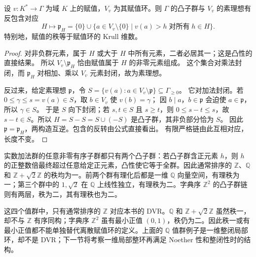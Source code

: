 \begin{proposition}\label{b3:prop:valuation-rank-dimension}
	设 \(v:K^*\rightarrow\Gamma\) 为域 \(K\) 上的赋值，\(V_v\) 为其赋值环。则 \(\Gamma\) 的凸子群与 \(V_v\) 的素理想有反包含对应
	\[
		H\longmapsto\mathfrak p_H =\{0\}\cup\bigl\{a\in V_v\setminus\{0\}\mid v(a)>h\;\text{对所有}\;h\in H\bigr\}.
	\]
	特别地，赋值的秩等于赋值环的 Krull 维数。
\end{proposition}
\begin{proof}
	对非负群元素，属于 \(H\) 或大于 \(H\) 中所有元素，二者必居其一；这是凸性的直接结果。 所以 \(V_v\setminus\mathfrak p_H\) 恰由赋值属于 \(H\) 的非零元素组成。 这个集合对乘法封闭，而 \(\mathfrak p_H\) 对相加、乘以 \(V_v\) 元素封闭，故为素理想。

	反过来，给定素理想 \(\mathfrak p\)，令 \(S=\bigl\{v(a):a\in V_v\setminus\mathfrak p\bigr\}\subseteq\Gamma_{\ge0}\)。 它对加法封闭。若 \(0\le\gamma\le s=v(a)\in S\)，取 \(b\in V_v\) 使 \(v(b)=\gamma\)； 因 \(b\mid a\)，\(b\in\mathfrak p\) 会迫使 \(a\in\mathfrak p\)，所以 \(\gamma\in S\)。 于是 \(S\) 向下封闭；若 \(s,t\in S\) 且 \(s\ge t\)，则 \(0\le s-t\le s\)，故 \(s-t\in S\)。所以 \(H=S-S=S\cup(-S)\) 是凸子群，其非负部分恰为 \(S\)。 因此 \(\mathfrak p=\mathfrak p_H\)，两构造互逆。包含的反转由公式直接看出。 有限严格链由此互相对应，长度不变。
\end{proof}

实数加法群的任意非零有序子群都只有两个凸子群：若凸子群含正元素 \(h\)，则 \(h\) 的正整数倍最终超过任意给定正元素，凸性使它等于全群。因此通常排序的 \(\mathbb Z\)、\(\mathbb Q\) 和 \(\mathbb Z+\sqrt2\mathbb Z\) 的秩均为一。前两个群有理化后都是一维 \(\mathbb Q\) 向量空间，有理秩为一；第三个群中的 \(1,\sqrt2\) 在 \(\mathbb Q\) 上线性独立，有理秩为二。字典序 \(\mathbb Z^2\) 的凸子群链则有两层，秩为二，其有理秩也为二。

\ProseParagraphBreak
这四个值群中，只有通常排序的 \(\mathbb Z\) 对应本书的 DVR。\(\mathbb Q\) 和 \(\mathbb Z+\sqrt2\mathbb Z\) 虽然秩一，却不与 \(\mathbb Z\) 有序同构；字典序 \(\mathbb Z^2\) 虽有最小正值 \((0,1)\)，秩仍为二。因此秩一或有最小正值都不能单独替代离散赋值环的定义。上面的 \(\mathbb Q\) 值群例子是一维整闭局部环，却不是 DVR；下一节将考察一维局部整环再满足 Noether 性和整闭性时的结构。
